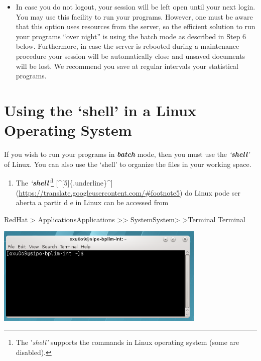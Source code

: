 \documentclass[]{book}
\providecommand{\tightlist}{%
  \setlength{\itemsep}{0pt}\setlength{\parskip}{0pt}}
\let\rmarkdownfootnote\footnote%
\def\footnote{\protect\rmarkdownfootnote}
\begin{document}
\begin{itemize}
\tightlist
\item
  In case you do not logout, your session will be left open until your
  next login. You may use this facility to run your programs. However,
  one must be aware that this option uses resources from the server,
  so the efficient solution to run your programs ``over night'' is using
  the batch mode as described in Step 6 below. Furthermore, in case
  the server is rebooted during a maintenance procedure your session
  will be automatically close and unsaved documents will be lost. We
  recommend you save at regular intervals your statistical programs.
\end{itemize}

\hypertarget{using-the-shell-in-a-linux-operating-system}{%
\section{\texorpdfstring{{Using the `shell' in a Linux Operating System}}{Using the `shell' in a Linux Operating System}}\label{using-the-shell-in-a-linux-operating-system}}

If you wish to run your
programs in \textbf{\emph{{batch}}} mode, then you must use the
\emph{`\textbf{shell}'} of Linux. You can also use the `shell' to organize the
files in your working space.

\begin{enumerate}
\def\labelenumi{\arabic{enumi}.}
\tightlist
\item
  The \emph{`\textbf{shell}'}\footnote{The '\emph{shell'} supports the commands in Linux operating system
    (some are disabled).}
  {[}\^{}{[}5{]}\{.underline\}\^{}{]}(\url{https://translate.googleusercontent.com/\#footnote5})
  do Linux pode ser aberta a partir d e in Linux can be accessed from
\end{enumerate}

RedHat \textgreater{} ApplicationsApplications \textgreater{}\textgreater{} SystemSystem\textgreater{} \textgreater{}Terminal
Terminal

\includegraphics[width=3.93701in,height=1.84868in]{./media/image9.png}
\end{document}
